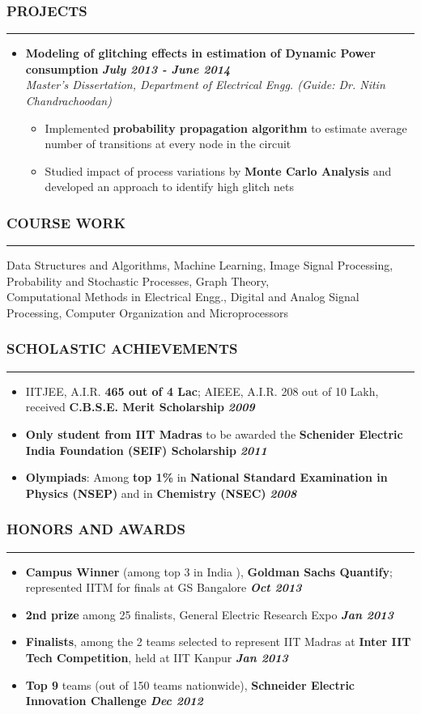 \documentclass[10pt,a4paper,English]{article}
\newcommand\roottitle[1]{\vspace{-4mm}\subsubsection*{\uppercase{#1}}\vspace{-0.3em}\nopagebreak[4]\hrule}
\newcommand\itemyear[1]{\hfill \textbf{\emph{\color{itemyear} #1}}}
\newcommand\itemenv{\setlength\itemsep{0.5pt} \addtolength{\itemindent}{-5mm}\vspace{-1.5mm}}
\begin{document}
\roottitle{Projects}
\vspace{4mm}
\begin{itemize} \itemenv
    \item \textbf{Modeling of glitching effects in estimation of Dynamic Power consumption} \hfill \itemyear{July 2013 - June 2014} \\
    \emph{Master's Dissertation, Department of Electrical Engg. (Guide: Dr. Nitin Chandrachoodan)}
        \begin{itemize} \itemenv
            \item Implemented \textbf{probability propagation algorithm} to estimate average number of transitions at every node in the circuit
            \item Studied impact of process variations by \textbf{Monte Carlo Analysis} and developed an approach to identify high glitch nets
        \end{itemize}
\end{itemize}

\roottitle{Course Work}
\vspace{2mm}
\noindent Data Structures and Algorithms, Machine Learning, Image Signal Processing, Probability and Stochastic Processes, Graph Theory, \\ 
Computational Methods in Electrical Engg., Digital and Analog Signal Processing, Computer Organization and Microprocessors
\vspace{2mm}

\roottitle{Scholastic Achievements}
\vspace{4mm}
\begin{itemize} \itemenv
    \item IITJEE, A.I.R. \textbf{465 out of 4 Lac}; AIEEE, A.I.R. 208 out of 10 Lakh, received \textbf{C.B.S.E. Merit Scholarship} \itemyear{2009}
    \item \textbf{Only student from IIT Madras} to be awarded the \textbf{Schenider Electric India Foundation (SEIF) Scholarship} \itemyear{2011} 
    \item \textbf{Olympiads}: Among \textbf{top 1\%} in \textbf{National Standard Examination in Physics (NSEP)} and in \textbf{Chemistry (NSEC)} \itemyear{2008}
\end{itemize}

\roottitle{Honors and Awards}
\vspace{4mm}
\begin{itemize} \itemenv
    \item \textbf{Campus Winner} (among top {3} in India ), \textbf{Goldman Sachs Quantify}; represented IITM for finals at GS Bangalore \itemyear{Oct 2013}
    \item \textbf{2nd prize} among 25 finalists, General Electric Research Expo \itemyear{Jan 2013}
    \item \textbf{Finalists}, among the 2 teams selected to represent IIT Madras at \textbf{Inter IIT Tech Competition}, held at IIT Kanpur \itemyear{Jan 2013}
    \item \textbf{Top 9} teams (out of 150 teams nationwide), \textbf{Schneider Electric Innovation Challenge} \itemyear{ Dec 2012 } 
\end{itemize}
\end{document}
